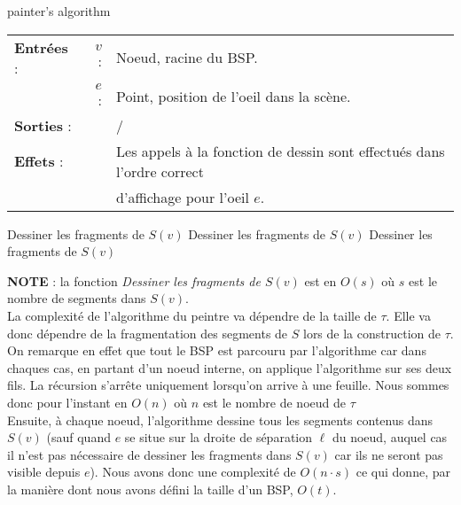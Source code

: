 \documentclass[11pts]{article}
\begin{document}
\begin{algorithm}[H]
\caption{painter's algorithm}
\begin{tabular}{lrl}
\textbf{Entrées} : &$v$ : &Noeud, racine du BSP.\\
&$e$ :&Point, position de l'oeil dans la scène.\\[.25cm]
\textbf{Sorties} :& &/\\[.25cm]
\textbf{Effets} :& &Les appels à la fonction de dessin sont effectués dans l'ordre correct\\
& & d'affichage pour l'oeil $e$.\\[.25cm]
\end{tabular}
\begin{algorithmic}[1]
	\State Dessiner les fragments de $S(v)$
\Else
		\State {}
		\State Dessiner les fragments de $S(v)$
		\State {}
		\State {}
		\State Dessiner les fragments de $S(v)$
		\State {}
	\Else
		\State {}
		\State {}
	\EndIf
\EndIf
\EndProcedure
\end{algorithmic}
\end{algorithm}
\noindent\textbf{NOTE} : la fonction \emph{Dessiner les fragments de $S(v)$} est en $O(s)$ où $s$ est le nombre de segments dans $S(v)$.\\[1cm]
La complexité de l'algorithme du peintre va dépendre de la taille de $\tau$. Elle va donc dépendre de la fragmentation des segments de $S$ lors de la construction de $\tau$.\\
On remarque en effet que tout le BSP est parcouru par l'algorithme car dans chaques cas, en partant d'un noeud interne, on applique l'algorithme sur ses deux fils. La récursion s'arrête uniquement lorsqu'on arrive à une feuille. Nous sommes donc pour l'instant en $O(n)$ où $n$ est le nombre de noeud de $\tau$\\[.2cm]
Ensuite, à chaque noeud, l'algorithme dessine tous les segments contenus dans $S(v)$ (sauf quand $e$ se situe sur la droite de séparation $\ell$ du noeud, auquel cas il n'est pas nécessaire de dessiner les fragments dans $S(v)$ car ils ne seront pas visible depuis $e$). Nous avons donc une complexité de $O(n\cdot s)$ ce qui donne, par la manière dont nous avons défini la taille d'un BSP, $O(t)$.
\end{document}
